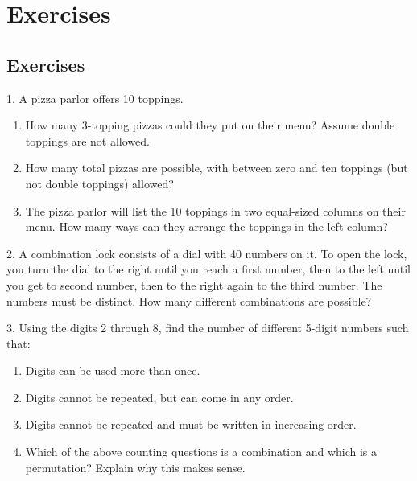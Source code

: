\documentclass[10pt,]{book}
\theoremstyle{plain}
\theoremstyle{definition}
\numberwithin{equation}{chapter}
\begin{document}
\section[Exercises]{Exercises}\label{section-7}
\typeout{************************************************}
\typeout{************************************************}
\subsection[Exercises]{Exercises}\label{exercises_counting-combperm}
\begin{exerciselist}
\item[1.]\hypertarget{exercise-69}{}
                A pizza parlor offers 10 toppings.
              \leavevmode%
\begin{enumerate}[label=(\alph*)]
\item\hypertarget{li-256}{} How many 3-topping pizzas could they put on their menu?  Assume double toppings are not allowed. %
\item\hypertarget{li-257}{} How many total pizzas are possible, with between zero and ten toppings (but not double toppings) allowed? %
\item\hypertarget{li-258}{} The pizza parlor will list the 10 toppings in two equal-sized columns on their menu.  How many ways can they arrange the toppings in the left column? %
\end{enumerate}

\par\smallskip
\item[2.]\hypertarget{exercise-70}{}
                A combination lock consists of a dial with 40 numbers on it. To open the lock, you turn the dial to the right until you reach a first number, then to the left until you get to second number, then to the right again to the third number. The numbers must be distinct. How many different combinations are possible?
\par\smallskip
\item[3.]\hypertarget{exercise-71}{}
                Using the digits 2 through 8, find the number of different 5-digit numbers such that:
              \leavevmode%
\begin{enumerate}[label=(\alph*)]
\item\hypertarget{li-262}{} Digits can be used more than once. %
\item\hypertarget{li-263}{} Digits cannot be repeated, but can come in any order. %
\item\hypertarget{li-264}{} Digits cannot be repeated and must be written in increasing order. %
\item\hypertarget{li-265}{} Which of the above counting questions is a combination and which is a permutation?  Explain why this makes sense. %
\end{enumerate}


\end{exerciselist}
\end{document}
